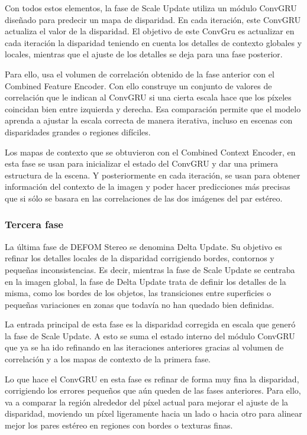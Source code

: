 Con todos estos elementos, la fase de Scale Update utiliza un módulo ConvGRU diseñado para predecir un mapa de disparidad. En cada iteración, este ConvGRU actualiza el valor de la disparidad. El objetivo de este ConvGru es actualizar en cada iteración la disparidad teniendo en cuenta los detalles de contexto globales y locales, mientras que el ajuste de los detalles se deja para una fase posterior. 

Para ello, usa el volumen de correlación obtenido de la fase anterior con el Combined Feature Encoder. Con ello construye un conjunto de valores de correlación que le indican al ConvGRU si una cierta escala hace que los píxeles coincidan bien entre izquierda y derecha. Esa comparación permite que el modelo aprenda a ajustar la escala correcta de manera iterativa, incluso en escenas con disparidades grandes o regiones difíciles.

Los mapas de contexto que se obtuvieron con el Combined Context Encoder, en esta fase se usan para inicializar el estado del ConvGRU y dar una primera estructura de la escena. Y posteriormente en cada iteración, se usan para obtener información del contexto de la imagen y poder hacer predicciones más precisas que si sólo se basara en las correlaciones de las dos imágenes del par estéreo.

\subsubsection{Tercera fase}
La última fase de DEFOM Stereo se denomina Delta Update. Su objetivo es refinar los detalles locales de la disparidad corrigiendo bordes, contornos y pequeñas inconsistencias. Es decir, mientras la fase de Scale Update se centraba en la imagen global, la fase de Delta Update trata de definir los detalles de la misma, como los bordes de los objetos, las transiciones entre superficies o pequeñas variaciones en zonas que todavía no han quedado bien definidas.

La entrada principal de esta fase es la disparidad corregida en escala que generó la fase de Scale Update. A esto se suma el estado interno del módulo ConvGRU que ya se ha ido refinando en las iteraciones anteriores gracias al volumen de correlación y a los mapas de contexto de la primera fase.

Lo que hace el ConvGRU en esta fase es refinar de forma muy fina la disparidad, corrigiendo los errores pequeños que aún queden de las fases anteriores. Para ello, va a comparar la región alrededor del píxel actual para mejorar el ajuste de la disparidad, moviendo un píxel ligeramente hacia un lado o hacia otro para alinear mejor los pares estéreo en regiones con bordes o texturas finas.

